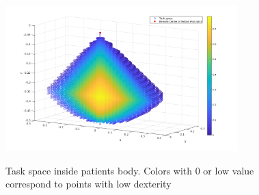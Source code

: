 \begin{center}
\begin{figure}[H]
\centering
\includegraphics[width=0.8\textwidth]{images/rcm_taskspace.png}\\
\caption{Task space inside patients body. Colors with 0 or low value correspond to points with low dexterity}
\end{figure}
\end{center}